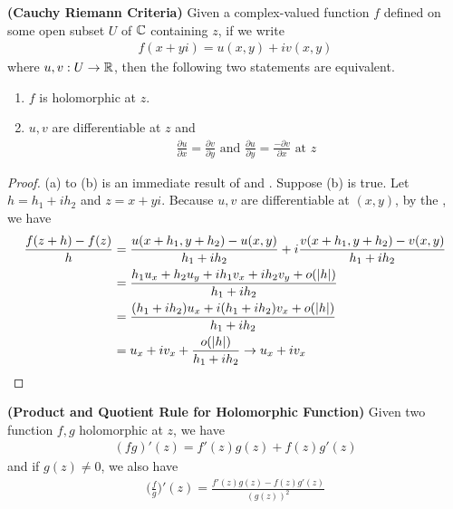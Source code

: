 \documentclass{report}
\begin{document}
\begin{theorem}
\label{Cauchy Riemann Criteria}
\textbf{(Cauchy Riemann Criteria)} Given a complex-valued function $f$ defined on some open subset $U$ of $\mathbb{C}$ containing  $z$, if we write 
 \begin{align*}
f(x+yi)=u(x,y)+iv(x,y)
\end{align*}
where $u,v:U\rightarrow \mathbb{R}$, then the following two statements are equivalent.
\begin{enumerate}[label=(\alph*)]
  \item $f$ is holomorphic at  $z$. 
  \item $u,v$ are differentiable at  $z$ and 
\begin{align*}
    \frac{\partial u}{\partial x}=\frac{\partial v}{\partial y}\text{ and }\frac{\partial u}{\partial y}=\frac{-\partial v}{\partial x}\text{ at }z
\end{align*}
\end{enumerate}
\end{theorem}
\begin{proof}
(a) to (b) is an immediate result of  and . Suppose  (b) is true. Let $h=h_1+ih_2$ and $z=x+yi$. Because $u,v$ are differentiable at  $(x,y)$, by the , we have 
\begin{align*}
\frac{f(z+h)-f(z)}{h}&= \frac{u(x+h_1,y+h_2)-u(x,y)}{h_1+ih_2}+ i \frac{v(x+h_1,y+h_2)-v(x,y)}{h_1+ih_2}\\
&=\frac{h_1u_x+h_2u_y+ih_1v_x+ih_2v_y+o(\left|h\right|)}{h_1+ih_2}\\
&=\frac{(h_1+ih_2)u_x+i(h_1+ih_2)v_x+o(\left|h\right|)}{h_1+ih_2}\\
&=u_x+iv_x+\frac{o(\left|h\right|)}{h_1+ih_2}\to u_x+iv_x
\end{align*}
\end{proof}
\begin{theorem}
\label{Product and Quotient Rule for Holomorphic Function}
\textbf{(Product and Quotient Rule for Holomorphic Function)} Given two function $f,g$ holomorphic at  $z$, we have 
 \begin{align*}
   (fg)'(z)= f'(z)g(z)+f(z)g'(z)
\end{align*}
and if $g(z)\neq 0$, we also have 
\begin{align*}
\Big(\frac{f}{g}\Big)'(z)=\frac{f'(z)g(z)-f(z)g'(z)}{(g(z))^2}
\end{align*}
\end{theorem}
\end{document}
